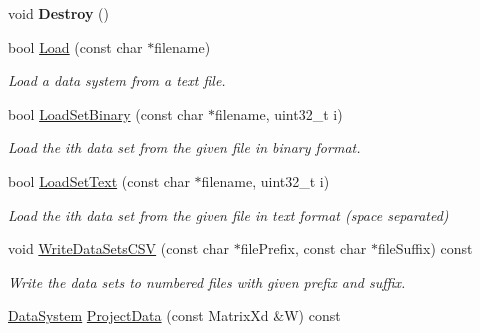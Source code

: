 \begin{DoxyCompactItemize}
\item 
\hypertarget{struct_d_r_d_s_p_1_1_data_system_a584d7c384388bc0fd6cda08aa50fc1cd}{void {\bfseries Destroy} ()}\label{struct_d_r_d_s_p_1_1_data_system_a584d7c384388bc0fd6cda08aa50fc1cd}

\item 
\hypertarget{struct_d_r_d_s_p_1_1_data_system_a1eda80428b462bb9870b17a151aa36b6}{bool \hyperlink{struct_d_r_d_s_p_1_1_data_system_a1eda80428b462bb9870b17a151aa36b6}{Load} (const char $\ast$filename)}\label{struct_d_r_d_s_p_1_1_data_system_a1eda80428b462bb9870b17a151aa36b6}

\begin{DoxyCompactList}\small\item\em Load a data system from a text file. \end{DoxyCompactList}\item 
\hypertarget{struct_d_r_d_s_p_1_1_data_system_a1199512ac121edb15215c5031a5ac531}{bool \hyperlink{struct_d_r_d_s_p_1_1_data_system_a1199512ac121edb15215c5031a5ac531}{Load\-Set\-Binary} (const char $\ast$filename, uint32\-\_\-t i)}\label{struct_d_r_d_s_p_1_1_data_system_a1199512ac121edb15215c5031a5ac531}

\begin{DoxyCompactList}\small\item\em Load the ith data set from the given file in binary format. \end{DoxyCompactList}\item 
\hypertarget{struct_d_r_d_s_p_1_1_data_system_ae1487971b82db1d86736eddd2c520355}{bool \hyperlink{struct_d_r_d_s_p_1_1_data_system_ae1487971b82db1d86736eddd2c520355}{Load\-Set\-Text} (const char $\ast$filename, uint32\-\_\-t i)}\label{struct_d_r_d_s_p_1_1_data_system_ae1487971b82db1d86736eddd2c520355}

\begin{DoxyCompactList}\small\item\em Load the ith data set from the given file in text format (space separated) \end{DoxyCompactList}\item 
\hypertarget{struct_d_r_d_s_p_1_1_data_system_a6b4e0e6bc3ba1135a08fc2c2ed874e39}{void \hyperlink{struct_d_r_d_s_p_1_1_data_system_a6b4e0e6bc3ba1135a08fc2c2ed874e39}{Write\-Data\-Sets\-C\-S\-V} (const char $\ast$file\-Prefix, const char $\ast$file\-Suffix) const }\label{struct_d_r_d_s_p_1_1_data_system_a6b4e0e6bc3ba1135a08fc2c2ed874e39}

\begin{DoxyCompactList}\small\item\em Write the data sets to numbered files with given prefix and suffix. \end{DoxyCompactList}\item 
\hypertarget{struct_d_r_d_s_p_1_1_data_system_afd5e714d21c0d7c1b1efb65b233788ab}{\hyperlink{struct_d_r_d_s_p_1_1_data_system}{Data\-System} \hyperlink{struct_d_r_d_s_p_1_1_data_system_afd5e714d21c0d7c1b1efb65b233788ab}{Project\-Data} (const Matrix\-Xd \&W) const }\label{struct_d_r_d_s_p_1_1_data_system_afd5e714d21c0d7c1b1efb65b233788ab}


\end{DoxyCompactItemize}
